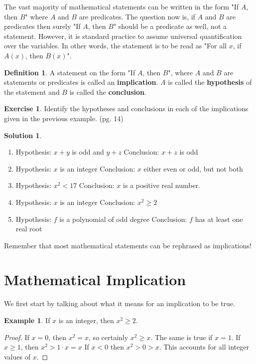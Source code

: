 \documentclass[a4paper, 11pt]{report}
\theoremstyle{plain}
\theoremstyle{definition}
\newtheorem{defn}[thm]{Definition}
\newtheorem{exmp}[thm]{Example}
\newtheorem{exrc}[thm]{Exercise}
\newtheorem*{sltn}{Solution}
\begin{document}
The vast majority of mathematical statements can be written in the form "If
$A$, then $B$" where $A$ and $B$ are predicates. The question now is, if $A$
and $B$ are predicates then surely "If $A$, then $B$" should be a predicate as
well, not a statement. However, it is standard practice to assume universal
quantification over the variables. In other words, the statement is to be read
as "For all $x$, if $A(x)$, then $B(x)$".

\begin{defn}
  A statement on the form "If $A$, then $B$", where $A$ and $B$ are statements
  or predicates is called an \textbf{implication}. $A$ is
  called the \textbf{hypothesis} of the statement and $B$ is
  called the \textbf{conclusion}.
\end{defn}

\addtocounter{thm}{1}

\begin{exrc}
  Identify the hypotheses and conclusions in each of the implications given in
  the previous example. (pg. 14)
\end{exrc}

\begin{sltn}
\begin{enumerate}
  \item Hypothesis: $x + y$ is odd and $y + z$
        Conclusion: $x + z$ is odd
  \item Hypothesis: $x$ is an integer
        Conclusion: $x$ either even or odd, but not both
  \item Hypothesis: $x^2 < 17$
        Conclusion: $x$ is a positive real number.
  \item Hypothesis: $x$ is an integer
        Conclusion: $x^2 \geq 2$
  \item Hypothesis: $f$ is a polynomial of odd degree
        Conclusion: $f$ has at least one real root
\end{enumerate}
\end{sltn}

Remember that most mathematical statements can be rephrased as implications!

\section{Mathematical Implication}
\label{sec:mathematical_implication}

We first start by talking about what it means for an implication to be true.
\begin{exmp}
  If $x$ is an integer, then $x^2 \geq 2$.  
\end{exmp}
\begin{proof}
  If $x = 0$, then $x^2 = x$, so certainly $x^2 \geq x$. The same is true if $x
  = 1$. If $x \geq 1$, then $x^2 > 1 \cdot x = x$ If $x < 0$ then $x^2 > 0 >
  x$. This accounts for all integer values of $x$.
\end{proof}
\end{document}
